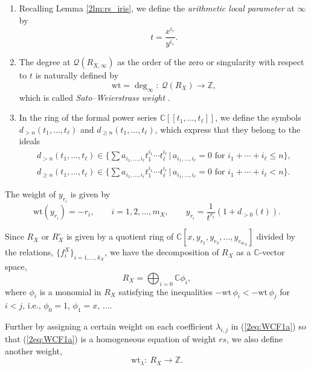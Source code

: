 \documentclass[pdftex]{sigma}
\def\CC{{\mathbb C}}
\def\ZZ{{\mathbb Z}}
\def\cQ{{\mathcal Q}}
\def\wt{{\mathrm {wt}}}
\numberwithin{equation}{section}
\begin{document}
\begin{Definition} \label{2df:wt_RX}\quad
\begin{enumerate}\itemsep=0pt
\item
Recalling Lemma \ref{2lm:rs_iris}, we define the \emph{arithmetic local parameter} at $\infty$ by \cite{Onishi18}
\[
t = \frac{x^{i_r}}{y^{i_s}}.
\]

\item The degree at $\cQ(R_{X,\infty})$ as the order of the zero or singularity with respect to $t$ is naturally defined by
\begin{equation*}
\wt=\deg_\infty\colon \ \cQ(R_X) \to \ZZ,%
\end{equation*}
which is called \emph{Sato--Weierstrass weight} \cite{Wei67}.

\item In the ring of the formal power series $\CC[[t_1, \dots, t_\ell]]$,
we define the symbols $d_{>n}(t_1, \dots, t_\ell)$ and $d_{\ge n}(t_1, \dots, t_\ell)$, which express that they belong to the ideals
\begin{gather*}
d_{>n}(t_1, \dots, t_\ell)\in \Big\{\sum a_{i_1,\dots, i_\ell} t_1^{i_1}
\cdots t_\ell^{i_\ell}\, |\,a_{i_1,\dots, i_\ell}=0
\text{ for } i_1+\cdots+i_\ell \leq n \Big\},
\\
d_{\ge n}(t_1, \dots, t_\ell)\in \Big\{\sum a_{i_1,\dots, i_\ell} t_1^{i_1} \cdots t_\ell^{i_\ell}\, |\,a_{i_1,\dots, i_\ell}=0
\text{ for }i_1+\cdots+i_\ell < n \Big\}.
\end{gather*}
\end{enumerate}
\end{Definition}

The weight of $y_{r_i}$ is given by
\[
\wt(y_{r_i}) = -r_i, \qquad i=1,2,\dots,{m_X},
\qquad
y_{r_i}=\frac{1}{t^{r_i}}(1+d_{>0}(t)).
\]

Since $R_X$ or $R_X^\circ$ is given by a quotient ring of $\CC[x,y_{r_2},y_{r_3},\dots, y_{r_{m_X}}]$ divided by the relations, $\big\{f_i^X\big\}_{i=1, \dots, k_X}$, we have the decomposition of $R_X$ as a $\CC$-vector space,
\begin{equation}
R_X = \bigoplus_{i=0} \CC \phi_i,\label{2eq:RXphi}
\end{equation}
where $\phi_i$ is a monomial in $R_X$ satisfying the inequalities $-\wt\,\phi_i < -\wt\,\phi_j$ for $i<j$, i.e., $\phi_0 = 1$, $\phi_1 = x$, $\dots$.

Further by assigning a certain weight on each coefficient $\lambda_{i,j}$ in (\ref{2eq:WCF1a}) so that (\ref{2eq:WCF1a}) is a homogeneous equation of weight $rs$, we also define another weight,
\begin{equation*}
\wt_\lambda\colon \ R_X \to \ZZ.%
\end{equation*}
\end{document}
